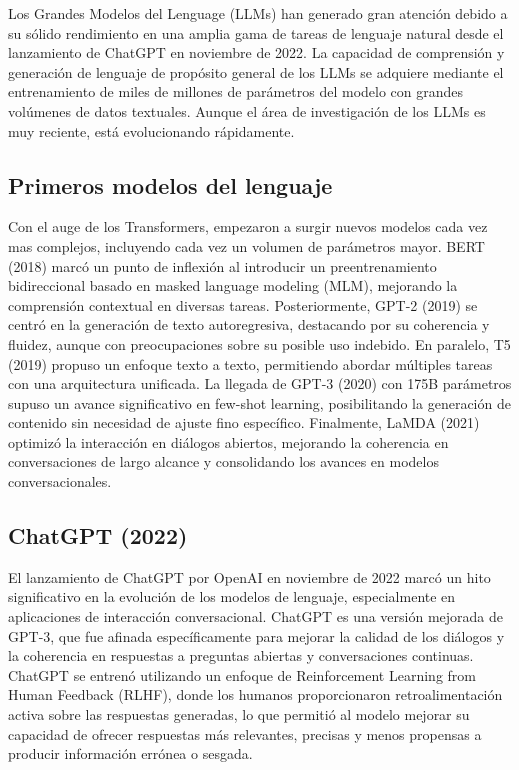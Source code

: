 Los Grandes Modelos del Lenguage (LLMs) han generado gran atención debido a su sólido rendimiento en una amplia gama de tareas de lenguaje natural desde el lanzamiento de ChatGPT en noviembre de 2022. 
La capacidad de comprensión y generación de lenguaje de propósito general de los LLMs se adquiere mediante el entrenamiento de miles de millones de parámetros del modelo con grandes volúmenes de datos textuales. 
Aunque el área de investigación de los LLMs es muy reciente, está evolucionando rápidamente.

\subsection{Primeros modelos del lenguaje}

Con el auge de los Transformers, empezaron a surgir nuevos modelos cada vez mas complejos, incluyendo cada vez un volumen de parámetros mayor.
BERT (2018) marcó un punto de inflexión al introducir un preentrenamiento bidireccional basado en masked language modeling (MLM), mejorando la comprensión contextual en diversas tareas. 
Posteriormente, GPT-2 (2019) se centró en la generación de texto autoregresiva, destacando por su coherencia y fluidez, aunque con preocupaciones sobre su posible uso indebido. 
En paralelo, T5 (2019) propuso un enfoque texto a texto, permitiendo abordar múltiples tareas con una arquitectura unificada. 
La llegada de GPT-3 (2020) con 175B parámetros supuso un avance significativo en few-shot learning, posibilitando la generación de contenido sin necesidad de ajuste fino específico. 
Finalmente, LaMDA (2021) optimizó la interacción en diálogos abiertos, mejorando la coherencia en conversaciones de largo alcance y consolidando los avances en modelos conversacionales. 

\subsection{ChatGPT (2022)}
El lanzamiento de ChatGPT por OpenAI en noviembre de 2022 marcó un hito significativo en la evolución de los modelos de lenguaje, especialmente en aplicaciones de interacción conversacional. 
ChatGPT es una versión mejorada de GPT-3, que fue afinada específicamente para mejorar la calidad de los diálogos y la coherencia en respuestas a preguntas abiertas y conversaciones continuas. 
ChatGPT se entrenó utilizando un enfoque de Reinforcement Learning from Human Feedback (RLHF), donde los humanos proporcionaron retroalimentación activa sobre las respuestas generadas, lo que permitió al modelo mejorar su capacidad de ofrecer respuestas más relevantes, precisas y menos propensas a producir información errónea o sesgada.



